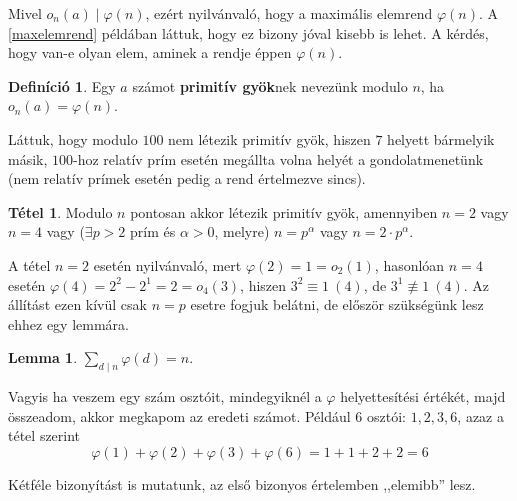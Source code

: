 \documentclass[12pt]{book}
\theoremstyle{plain} %
\theoremstyle{definition} %
\newtheorem{defi/}{Definíció}[section]
\newenvironment{defi}
  {\renewcommand{\qedsymbol}{$\clubsuit$}%
   \pushQED{\qed}\begin{defi/}}
  {\popQED\end{defi/}}
\newtheorem{lem/}{Lemma}[section]
\newenvironment{lem}
  {\renewcommand{\qedsymbol}{$\clubsuit$}%
   \pushQED{\qed}\begin{lem/}}
  {\popQED\end{lem/}}
\newtheorem{theo/}{Tétel}[section]
\newenvironment{theo}
  {\renewcommand{\qedsymbol}{$\clubsuit$}%
   \pushQED{\qed}\begin{theo/}}
  {\popQED\end{theo/}}
\theoremstyle{remark}
\renewcommand\qedsymbol{$\blacksquare$}
\numberwithin{equation}{section}  %
\begin{document}
	Mivel $o_n(a)\mid \varphi(n)$, ezért nyilvánvaló, hogy a maximális elemrend $\varphi(n)$. A \ref{maxelemrend} példában láttuk, hogy ez bizony jóval kisebb is lehet. A kérdés, hogy van-e olyan elem, aminek a rendje éppen $\varphi(n)$.
	
	\begin{defi}
		Egy $a$ számot \textbf{primitív gyök}nek nevezünk modulo $n$, ha $o_n(a)=\varphi(n)$.
	\end{defi}

	Láttuk, hogy modulo $100$ nem létezik primitív gyök, hiszen $7$ helyett bármelyik másik, $100$-hoz relatív prím esetén megállta volna helyét a gondolatmenetünk (nem relatív prímek esetén pedig a rend értelmezve sincs).

	\begin{theo}
		Modulo $n$ pontosan akkor létezik primitív gyök, amennyiben $n=2$ vagy $n=4$ vagy ($\exists p>2$ prím és $\alpha>0$, melyre) $n=p^{\alpha}$ vagy $n=2\cdot p^{\alpha}$. 
	\end{theo}
	
	A tétel $n=2$ esetén nyilvánvaló, mert $\varphi(2)=1=o_2(1)$, hasonlóan $n=4$ esetén $\varphi(4)=2^2-2^1 = 2 = o_4(3)$, hiszen $3^2\equiv 1\ (4)$, de $3^1\not \equiv 1 \ (4)$. Az állítást ezen kívül csak $n=p$ esetre fogjuk belátni, de először szükségünk lesz ehhez egy lemmára.
	
	\begin{lem}\label{lemma}
		$\displaystyle \sum_{d\mid n} \varphi(d) = n$.
	\end{lem}

	Vagyis ha veszem egy szám osztóit, mindegyiknél a $\varphi$ helyettesítési értékét, majd összeadom, akkor megkapom az eredeti számot. Például 6 osztói: $1,2,3,6$, azaz a tétel szerint
	\[ \varphi(1)+\varphi(2)+\varphi(3)+\varphi(6)= 1+1+2+2 =6  \]

	Kétféle bizonyítást is mutatunk, az első bizonyos értelemben ,,elemibb'' lesz.
\end{document}
